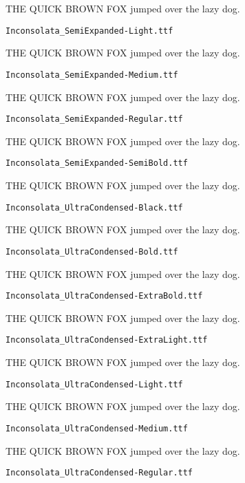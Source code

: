 \documentclass{article}
\begin{document}
THE QUICK BROWN FOX jumped over the lazy dog.

\setmainfont[Extension=.ttf]{Inconsolata_SemiExpanded-Light}
\noindent \verb!Inconsolata_SemiExpanded-Light.ttf!

THE QUICK BROWN FOX jumped over the lazy dog.

\setmainfont[Extension=.ttf]{Inconsolata_SemiExpanded-Medium}
\noindent \verb!Inconsolata_SemiExpanded-Medium.ttf!

THE QUICK BROWN FOX jumped over the lazy dog.

\setmainfont[Extension=.ttf]{Inconsolata_SemiExpanded-Regular}
\noindent \verb!Inconsolata_SemiExpanded-Regular.ttf!

THE QUICK BROWN FOX jumped over the lazy dog.

\setmainfont[Extension=.ttf]{Inconsolata_SemiExpanded-SemiBold}
\noindent \verb!Inconsolata_SemiExpanded-SemiBold.ttf!

THE QUICK BROWN FOX jumped over the lazy dog.

\setmainfont[Extension=.ttf]{Inconsolata_UltraCondensed-Black}
\noindent \verb!Inconsolata_UltraCondensed-Black.ttf!

THE QUICK BROWN FOX jumped over the lazy dog.

\setmainfont[Extension=.ttf]{Inconsolata_UltraCondensed-Bold}
\noindent \verb!Inconsolata_UltraCondensed-Bold.ttf!

THE QUICK BROWN FOX jumped over the lazy dog.

\setmainfont[Extension=.ttf]{Inconsolata_UltraCondensed-ExtraBold}
\noindent \verb!Inconsolata_UltraCondensed-ExtraBold.ttf!

THE QUICK BROWN FOX jumped over the lazy dog.

\setmainfont[Extension=.ttf]{Inconsolata_UltraCondensed-ExtraLight}
\noindent \verb!Inconsolata_UltraCondensed-ExtraLight.ttf!

THE QUICK BROWN FOX jumped over the lazy dog.

\setmainfont[Extension=.ttf]{Inconsolata_UltraCondensed-Light}
\noindent \verb!Inconsolata_UltraCondensed-Light.ttf!

THE QUICK BROWN FOX jumped over the lazy dog.

\setmainfont[Extension=.ttf]{Inconsolata_UltraCondensed-Medium}
\noindent \verb!Inconsolata_UltraCondensed-Medium.ttf!

THE QUICK BROWN FOX jumped over the lazy dog.

\setmainfont[Extension=.ttf]{Inconsolata_UltraCondensed-Regular}
\noindent \verb!Inconsolata_UltraCondensed-Regular.ttf!
\end{document}
